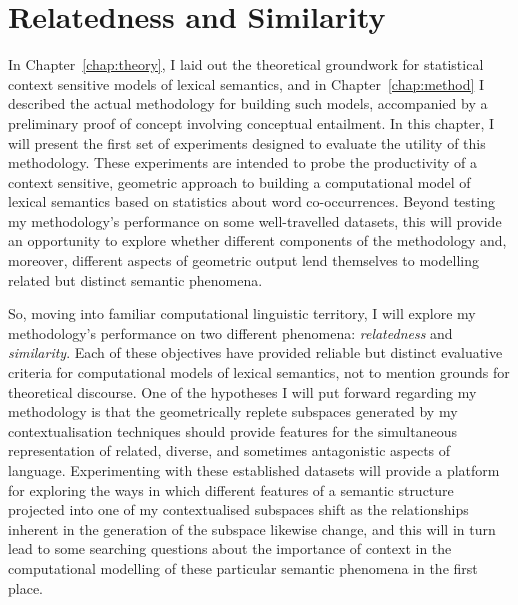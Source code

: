 \chapter{Relatedness and Similarity} \label{chap:relsim}
In Chapter~\ref{chap:theory}, I laid out the theoretical groundwork for statistical context sensitive models of lexical semantics, and in Chapter~\ref{chap:method} I described the actual methodology for building such models, accompanied by a preliminary proof of concept involving conceptual entailment.  In this chapter, I will present the first set of experiments designed to evaluate the utility of this methodology.  These experiments are intended to probe the productivity of a context sensitive, geometric approach to building a computational model of lexical semantics based on statistics about word co-occurrences.  Beyond testing my methodology's performance on some well-travelled datasets, this will provide an opportunity to explore whether different components of the methodology and, moreover, different aspects of geometric output lend themselves to modelling related but distinct semantic phenomena.

So, moving into familiar computational linguistic territory, I will explore my methodology's performance on two different phenomena: \emph{relatedness} and \emph{similarity}.  Each of these objectives have provided reliable but distinct evaluative criteria for computational models of lexical semantics, not to mention grounds for theoretical discourse.  One of the hypotheses I will put forward regarding my methodology is that the geometrically replete subspaces generated by my contextualisation techniques should provide features for the simultaneous representation of related, diverse, and sometimes antagonistic aspects of language.  Experimenting with these established datasets will provide a platform for exploring the ways in which different features of a semantic structure projected into one of my contextualised subspaces shift as the relationships inherent in the generation of the subspace likewise change, and this will in turn lead to some searching questions about the importance of context in the computational modelling of these particular semantic phenomena in the first place.

